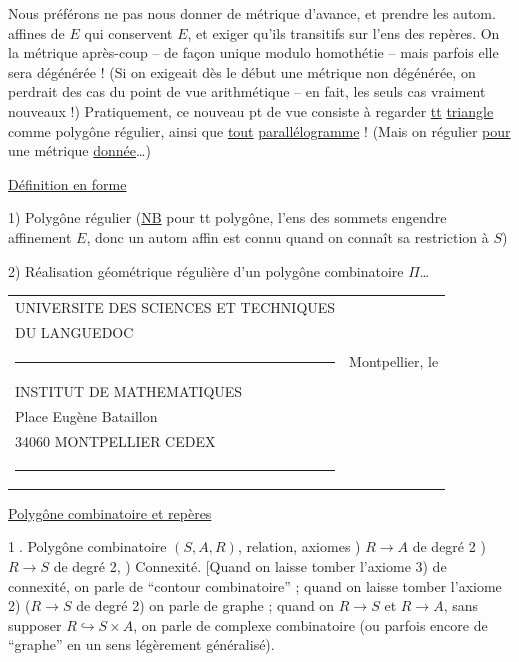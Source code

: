 Nous préférons ne pas nous donner de métrique
d'avance, et prendre les autom. affines de $E$
qui conservent $E$, et exiger qu'ils  transitifs
sur l'ens des repères. On  la métrique
après-coup -- de façon unique modulo homothétie
-- mais parfois elle sera dégénérée ! (Si on exigeait
dès le début une métrique non dégénérée, on perdrait
des cas   du point de
vue arithmétique -- en fait, les seuls cas vraiment
nouveaux !) Pratiquement, ce nouveau pt
de vue consiste à regarder \uline{tt} \uline{triangle} comme
polygône régulier, ainsi que \uline{tout} \uline{parallélogramme} !
(Mais on  régulier \uline{pour} une métrique
\uline{donnée}\ldots)

\uline{Définition en forme}

1) Polygône régulier (\uline{NB} pour tt polygône, l'ens des
sommets engendre affinement $E$, donc un autom
affin est connu quand on connaît sa restriction à $S$)

2) Réalisation géométrique régulière d'un polygône
combinatoire $\Pi$\ldots
\begin{tabular}{@{}l@{\qquad}l@{}}
UNIVERSITE DES SCIENCES ET TECHNIQUES &\\
DU LANGUEDOC &\\
\rule{1.4em}{.35pt}& Montpellier, le\\
INSTITUT DE MATHEMATIQUES &\\
Place Eugène Bataillon &\\
34060 MONTPELLIER CEDEX &\\
\rule{1.4em}{.35pt}&
\end{tabular}
\uline{Polygône combinatoire et repères}

\textcircled{\small 1.} Polygône combinatoire $(S,A,R)$,
relation, axiomes ) $R\to A$ de degré 2 ) $R\to S$ de
degré 2, ) Connexité. [Quand on laisse tomber
l'axiome 3) de connexité, on parle de ``contour
combinatoire'' ; quand on laisse tomber  l'axiome 2)
($R\to S$ de degré 2) on parle de graphe ; quand
on   $R\to S$ et $R\to A$, sans supposer $R\hookrightarrow S\times A$,
on parle de  complexe  
combinatoire (ou parfois encore de ``graphe'' en
un sens légèrement généralisé).

